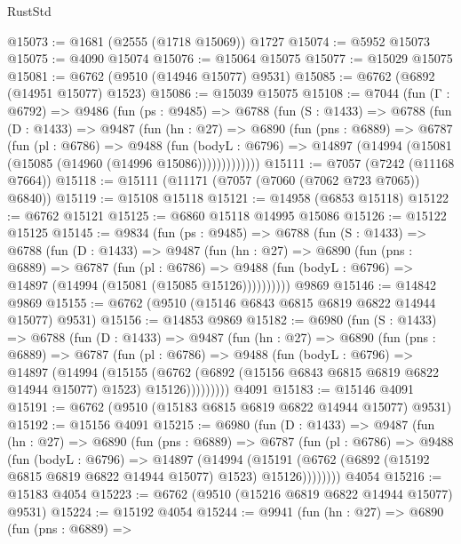 \begin{lexlean}{RustStd}
\begin{coremodule}
@15073 := @1681 (@2555 (@1718 @15069)) @1727
@15074 := @5952 @15073
@15075 := @4090 @15074
@15076 := @15064 @15075
@15077 := @15029 @15075
@15081 := @6762 (@9510 (@14946 @15077) @9531)
@15085 := @6762 (@6892 (@14951 @15077) @1523)
@15086 := @15039 @15075
@15108 := @7044
    (fun (Γ : @6792) =>
    @9486
      (fun (ps : @9485) =>
      @6788
        (fun (S : @1433) =>
        @6788
          (fun (D : @1433) =>
          @9487
            (fun (hn : @27) =>
            @6890
              (fun (pns : @6889) =>
              @6787
                (fun (pl : @6786) =>
                @9488
                  (fun (bodyL : @6796) =>
                  @14897 (@14994 (@15081 (@15085 (@14960 (@14996 @15086)))))))))))))
@15111 := @7057 (@7242 (@11168 @7664))
@15118 := @15111 (@11171 (@7057 (@7060 (@7062 @723 @7065)) @6840))
@15119 := @15108 @15118
@15121 := @14958 (@6853 @15118)
@15122 := @6762 @15121
@15125 := @6860 @15118 @14995 @15086
@15126 := @15122 @15125
@15145 := @9834
    (fun (ps : @9485) =>
    @6788
      (fun (S : @1433) =>
      @6788
        (fun (D : @1433) =>
        @9487
          (fun (hn : @27) =>
          @6890
            (fun (pns : @6889) =>
            @6787
              (fun (pl : @6786) =>
              @9488 (fun (bodyL : @6796) => @14897 (@14994 (@15081 (@15085 @15126))))))))))
    @9869
@15146 := @14842 @9869
@15155 := @6762 (@9510 (@15146 @6843 @6815 @6819 @6822 @14944 @15077) @9531)
@15156 := @14853 @9869
@15182 := @6980
    (fun (S : @1433) =>
    @6788
      (fun (D : @1433) =>
      @9487
        (fun (hn : @27) =>
        @6890
          (fun (pns : @6889) =>
          @6787
            (fun (pl : @6786) =>
            @9488
              (fun (bodyL : @6796) =>
              @14897
                (@14994
                  (@15155
                    (@6762
                      (@6892 (@15156 @6843 @6815 @6819 @6822 @14944 @15077) @1523)
                      @15126)))))))))
    @4091
@15183 := @15146 @4091
@15191 := @6762 (@9510 (@15183 @6815 @6819 @6822 @14944 @15077) @9531)
@15192 := @15156 @4091
@15215 := @6980
    (fun (D : @1433) =>
    @9487
      (fun (hn : @27) =>
      @6890
        (fun (pns : @6889) =>
        @6787
          (fun (pl : @6786) =>
          @9488
            (fun (bodyL : @6796) =>
            @14897
              (@14994
                (@15191 (@6762 (@6892 (@15192 @6815 @6819 @6822 @14944 @15077) @1523) @15126))))))))
    @4054
@15216 := @15183 @4054
@15223 := @6762 (@9510 (@15216 @6819 @6822 @14944 @15077) @9531)
@15224 := @15192 @4054
@15244 := @9941
    (fun (hn : @27) =>
    @6890
      (fun (pns : @6889) =>

\end{coremodule}
\end{lexlean}
